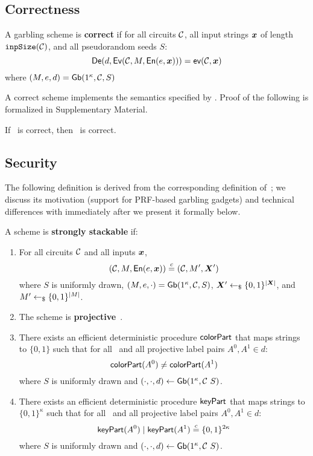 \subsection{Correctness}\label{sec:correctness}

\begin{definition}[Correctness]\label{def:correct}
  A garbling scheme is \textbf{correct} if for
  all circuits $\mathcal C$,
  all input strings $\cirinp$ of length $\mathtt{inpSize}(\mathcal C)$,
  and all pseudorandom seeds $S$:
  \[
    \gDe(d, \gEv(\cir, \mat,\gEn(e,\cirinp))) = \gev(\cir,\cirinp)
  \]
  where $(M, e, d) = \textsf{Gb}(1^\kappa,\mathcal C,S)$
\end{definition}

A correct scheme implements the semantics specified by \gev.
Proof of the following is formalized in Supplementary Material.

\begin{theorem}\label{theorem:correctness}
  If \underscheme\ is correct, then \ourschemelong\ is correct.
\end{theorem}

\subsection{Security}

The following definition is derived from the corresponding definition
of~\HK; we discuss its motivation (support for PRF-based garbling
gadgets) and technical differences with \HK immediately after we
present it formally below.

\begin{definition}\label{def:stackable}
  A scheme is \textbf{strongly stackable} if:
  \begin{enumerate}
    \item
      For
      all circuits $\mathcal C$
      and all inputs $\cirinp$,
      \[
        (\cir, \mat, \gEn(e, \cirinp)) \indist (\cir, \mat', \gcirinp')
      \]
      where
      $S$ is uniformly drawn,
      $(M, e, \cdot) = \textsf{Gb}(1^\kappa, \mathcal C, S)$,
      $\gcirinp' \drawnfrom{} \{0, 1\}^{|\gcirinp|}$,
      and $M' \gets_{\$} \{0, 1\}^{|M|}$.
    \item
      The scheme is \textbf{projective}~\cite{CCS:BelHoaRog12}.
    \item
      There exists an efficient deterministic procedure $\textsf{colorPart}$ that
      maps strings to $\{0, 1\}$ such that for all \cir\ and all
      projective label pairs $A^0, A^1 \in d$:
      \[
        \textsf{colorPart}(A^0) \neq \textsf{colorPart}(A^1)
      \]
      where $S$ is uniformly drawn and $(\cdot, \cdot, d) \gets \textsf{Gb}(1^\kappa, \mathcal C\ S)$.
    \item
      There exists an efficient deterministic procedure $\textsf{keyPart}$ that
      maps strings to $\{0, 1\}^\kappa$ such that for all \cir\ and all
      projective label pairs $A^0, A^1 \in d$:
      \[
        \textsf{keyPart}(A^0) \mid \textsf{keyPart}(A^1) \overset{c}{=} \{0, 1\}^{2\kappa}
      \]
      where $S$ is uniformly drawn and $(\cdot, \cdot, d) \gets \textsf{Gb}(1^\kappa, \mathcal C\ S)$.
  \end{enumerate}
\end{definition}


